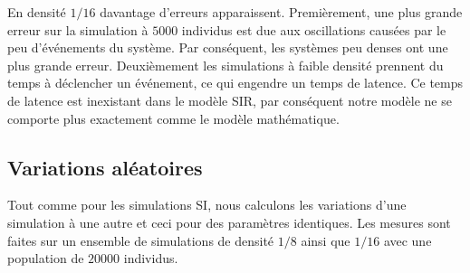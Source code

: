 En densité $1/16$ davantage d'erreurs apparaissent. Premièrement, une plus grande erreur sur la simulation à $5000$ individus est due aux oscillations causées par le peu d'événements du système. Par conséquent, les systèmes peu denses ont une plus grande erreur. Deuxièmement les simulations à faible densité prennent du temps à déclencher un événement, ce qui engendre un temps de latence. Ce temps de latence est inexistant dans le modèle SIR, par conséquent notre modèle ne se comporte plus exactement comme le modèle mathématique.

\newpage

\subsection{Variations aléatoires}

Tout comme pour les simulations SI, nous calculons les variations d'une simulation à une autre et ceci pour des paramètres identiques. Les mesures sont faites sur un ensemble de simulations de densité $1/8$ ainsi que $1/16$ avec une population de $20000$ individus.

